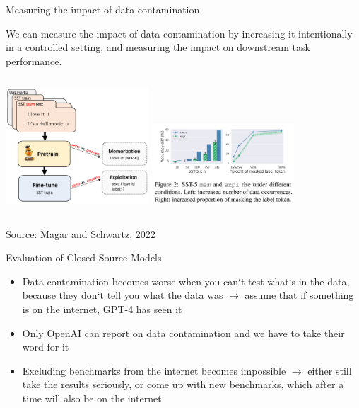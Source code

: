 \begin{vbframe}{Measuring the impact of data contamination}

	We can measure the impact of data contamination by increasing it intentionally in a controlled setting, and measuring the impact on downstream task performance.
	\begin{columns}
		
		\includegraphics[width=0.4\textwidth]{evaluation_figures/exploitation_graph.png}
		\includegraphics[width=0.4\textwidth]{evaluation_figures/exploitation_barchart.png}
	  
	\end{columns}

\tiny
Source: Magar and Schwartz, 2022
\end{vbframe}

\begin{vbframe}{Evaluation of Closed-Source Models}
	\vfill
	\begin{itemize}
		\item Data contamination becomes worse when you can‘t test what‘s in the data, because they don‘t tell you what the data was $\rightarrow$ assume that if something is on the internet, GPT-4 has seen it
		\item Only OpenAI can report on data contamination and we have to take their word for it
		\item Excluding benchmarks from the internet becomes impossible $\rightarrow$ either still take the results seriously, or come up with new benchmarks, which after a time will also be on the internet
	\end{itemize}

\end{vbframe}
	
